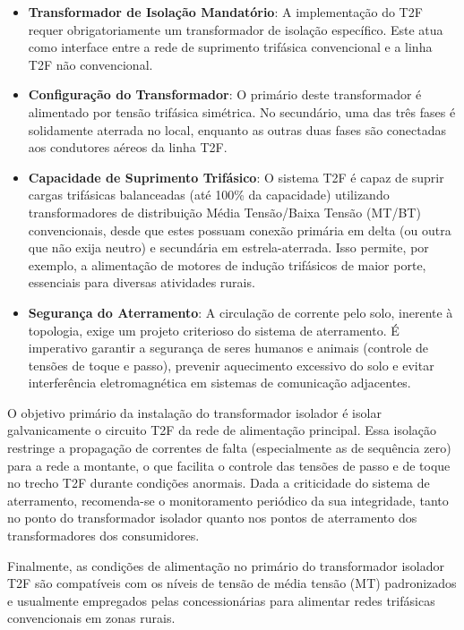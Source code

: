 \documentclass[oneside,openright,12pt]{ufsm_2021} %
\begin{document}
\begin{itemize}
	\item \textbf{Transformador de Isolação Mandatório}: A implementação do T2F requer obrigatoriamente um transformador de isolação específico. Este atua como interface entre a rede de suprimento trifásica convencional e a linha T2F não convencional.
	\item \textbf{Configuração do Transformador}: O primário deste transformador é alimentado por tensão trifásica simétrica. No secundário, uma das três fases é solidamente aterrada no local, enquanto as outras duas fases são conectadas aos condutores aéreos da linha T2F.
	\item \textbf{Capacidade de Suprimento Trifásico}: O sistema T2F é capaz de suprir cargas trifásicas balanceadas (até 100\% da capacidade) utilizando transformadores de distribuição Média Tensão/Baixa Tensão (MT/BT) convencionais, desde que estes possuam conexão primária em delta (ou outra que não exija neutro) e secundária em estrela-aterrada. Isso permite, por exemplo, a alimentação de motores de indução trifásicos de maior porte, essenciais para diversas atividades rurais.
	\item \textbf{Segurança do Aterramento}: A circulação de corrente pelo solo, inerente à topologia, exige um projeto criterioso do sistema de aterramento. É imperativo garantir a segurança de seres humanos e animais (controle de tensões de toque e passo), prevenir aquecimento excessivo do solo e evitar interferência eletromagnética em sistemas de comunicação adjacentes.
\end{itemize} 

\par O objetivo primário da instalação do transformador isolador é isolar galvanicamente o circuito T2F da rede de alimentação principal. Essa isolação restringe a propagação de correntes de falta (especialmente as de sequência zero) para a rede a montante, o que facilita o controle das tensões de passo e de toque no trecho T2F durante condições anormais. Dada a criticidade do sistema de aterramento, recomenda-se o monitoramento periódico da sua integridade, tanto no ponto do transformador isolador quanto nos pontos de aterramento dos transformadores dos consumidores.

\par Finalmente, as condições de alimentação no primário do transformador isolador T2F são compatíveis com os níveis de tensão de média tensão (MT) padronizados e usualmente empregados pelas concessionárias para alimentar redes trifásicas convencionais em zonas rurais.
\end{document}
